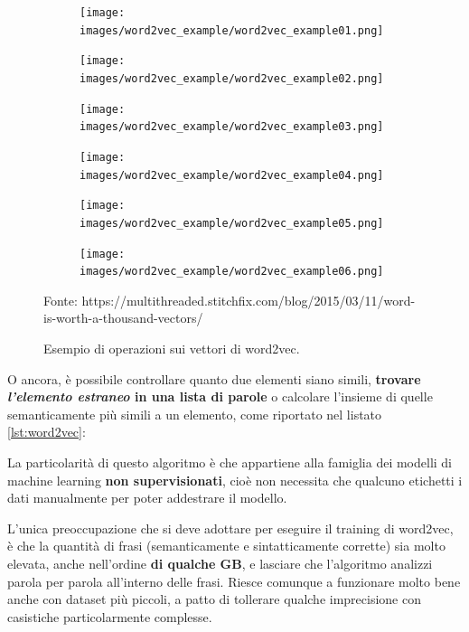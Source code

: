 \documentclass[12pt,a4paper,twoside,openright]{book}
\begin{document}
\begin{figure}[H]
\centering
    \begin{subfigure}[b]{0.3\textwidth}
    \texttt{[image: images/word2vec\_example/word2vec\_example01.png]}
    \end{subfigure}
\quad
    \begin{subfigure}[b]{0.3\textwidth}
    \texttt{[image: images/word2vec\_example/word2vec\_example02.png]}
    \end{subfigure}
\quad
    \begin{subfigure}[b]{0.3\textwidth}
    \texttt{[image: images/word2vec\_example/word2vec\_example03.png]}
    \end{subfigure}
\quad
    \begin{subfigure}[b]{0.3\textwidth}
    \texttt{[image: images/word2vec\_example/word2vec\_example04.png]}
    \end{subfigure}
\quad
    \begin{subfigure}[b]{0.3\textwidth}
    \texttt{[image: images/word2vec\_example/word2vec\_example05.png]}
    \end{subfigure}
\quad
    \begin{subfigure}[b]{0.3\textwidth}
    \texttt{[image: images/word2vec\_example/word2vec\_example06.png]}
    \end{subfigure}
\caption{Esempio di operazioni sui vettori di word2vec.}
\tiny{Fonte: https://multithreaded.stitchfix.com/blog/2015/03/11/word-is-worth-a-thousand-vectors/}

\label{fig:word2vec_analogy_queen_king}
\end{figure}

O ancora, è possibile controllare quanto due elementi siano simili, \textbf{trovare \emph{l'elemento estraneo} in una lista di parole} o calcolare l'insieme di quelle semanticamente più simili a un elemento, come riportato nel listato \ref{lst:word2vec}:



La particolarità di questo algoritmo è che appartiene alla famiglia dei modelli di machine learning \textbf{non supervisionati}, cioè non necessita che qualcuno etichetti i dati manualmente per poter addestrare il modello.

L'unica preoccupazione che si deve adottare per eseguire il training di word2vec, è che la quantità di frasi (semanticamente e sintatticamente corrette) sia molto elevata, anche nell'ordine \textbf{di qualche GB}, e lasciare che l'algoritmo analizzi parola per parola all'interno delle frasi. Riesce comunque a funzionare molto bene anche con dataset più piccoli, a patto di tollerare qualche imprecisione con casistiche particolarmente complesse.
\end{document}
